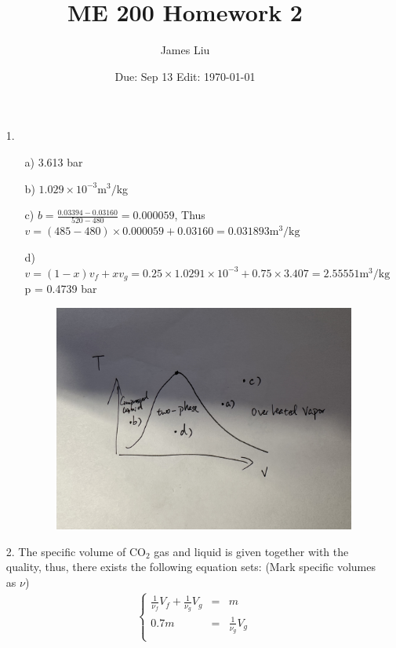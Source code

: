 \documentclass{article}
\date{Due: Sep 13  Edit: \today}
\title{ME 200 Homework 2}
\author{James Liu}
\begin{document}
\maketitle
\begin{itemize}
    \item [1.] 
    \begin{itemize}
        \item [a)] 3.613 bar
        \item [b)] \(1.029\times 10^{-3}\)m\(^3/\)kg
        \item [c)] \(b = \frac {0.03394-0.03160}{520-480}=0.000059\), Thus \(v=(485-480)\times0.000059+0.03160=0.031893 \text{m}^3/\text{kg}\)
        \item [d)] \(v = (1-x)v_f+xv_g=0.25\times1.0291\times10^{-3}+0.75\times3.407=2.55551 \text{m}^3/\text{kg}\)
        \\ p = 0.4739 bar
        \begin{figure}[h]
            \centering
            \includegraphics*[scale=0.05]{image/fig1.jpeg}
        \end{figure}
    \end{itemize}
    \item [2.] The specific volume of CO\(_2\) gas and liquid is given together with the quality, thus, there exists the following equation sets:
    (Mark specific volumes as \(\nu\))
    \begin{align*}
        \left\{
        \begin{matrix}
            \frac{1}{\nu_f}V_f+\frac{1}{\nu_g}V_g &= &m\\
            0.7m&=&\frac{1}{\nu_g}V_g\\

\end{matrix}
\end{align*}
\end{itemize}
\end{document}
